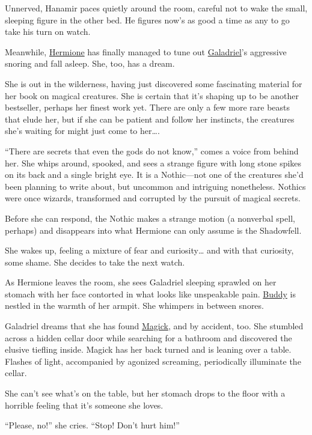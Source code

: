 \documentclass[smalldemyvopaper,11pt,twoside,onecolumn,openright,extrafontsizes]{memoir}
\newlength\drop
\begin{document}
Unnerved, Hanamir paces quietly around the room, careful not to wake the
small, sleeping figure in the other bed. He figures now's as good a time
as any to go take his turn on watch.

Meanwhile, \href{/characters/hermione/}{Hermione} has finally managed to
tune out \href{/characters/galadriel/}{Galadriel}'s aggressive snoring
and fall asleep. She, too, has a dream.

She is out in the wilderness, having just discovered some fascinating
material for her book on magical creatures. She is certain that it's
shaping up to be another bestseller, perhaps her finest work yet. There
are only a few more rare beasts that elude her, but if she can be
patient and follow her instincts, the creatures she's waiting for might
just come to her\ldots.

``There are secrets that even the gods do not know,'' comes a voice from
behind her. She whips around, spooked, and sees a strange figure with
long stone spikes on its back and a single bright eye. It is a
Nothic---not one of the creatures she'd been planning to write about,
but uncommon and intriguing nonetheless. Nothics were once wizards,
transformed and corrupted by the pursuit of magical secrets.

Before she can respond, the Nothic makes a strange motion (a nonverbal
spell, perhaps) and disappears into what Hermione can only assume is the
Shadowfell.

She wakes up, feeling a mixture of fear and curiosity\ldots{} and with
that curiosity, some shame. She decides to take the next watch.

As Hermione leaves the room, she sees Galadriel sleeping sprawled on her
stomach with her face contorted in what looks like unspeakable pain.
\href{/characters/buddy/}{Buddy} is nestled in the warmth of her armpit.
She whimpers in between snores.

Galadriel dreams that she has found \href{/characters/magick/}{Magick},
and by accident, too. She stumbled across a hidden cellar door while
searching for a bathroom and discovered the elusive tiefling inside.
Magick has her back turned and is leaning over a table. Flashes of
light, accompanied by agonized screaming, periodically illuminate the
cellar.

She can't see what's on the table, but her stomach drops to the floor
with a horrible feeling that it's someone she loves.

``Please, no!'' she cries. ``Stop! Don't hurt him!''
\end{document}
